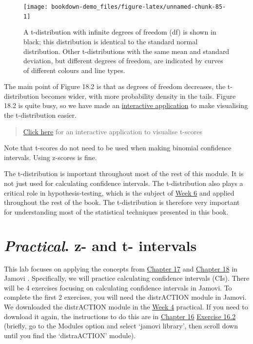 \documentclass[
]{scrbook}
\begin{document}
\begin{figure}
\texttt{[image: bookdown-demo\_files/figure-latex/unnamed-chunk-85-1]} \caption{A t-distribution with infinite degrees of freedom (df) is shown in black; this distribution is identical to the standard normal distribution. Other t-distributions with the same mean and standard deviation, but different degrees of freedom, are indicated by curves of different colours and line types.}\label{fig:unnamed-chunk-85}
\end{figure}

The main point of Figure 18.2 is that as degrees of freedom decreases, the t-distribution becomes wider, with more probability density in the tails.
Figure 18.2 is quite busy, so we have made an \href{https://bradduthie.shinyapps.io/t_score/}{interactive application} to make visualising the t-distribution easier.

\begin{quote}
\href{https://bradduthie.shinyapps.io/t_score/}{Click here} for an interactive application to visualise t-scores
\end{quote}

Note that t-scores do not need to be used when making binomial confidence intervals.
Using z-scores is fine.

The t-distribution is important throughout most of the rest of this module.
It is not just used for calculating confidence intervals.
The t-distribution also plays a critical role in hypothesis-testing, which is the subject of \protect\hyperlink{Week_6}{Week 6} and applied throughout the rest of the book.
The t-distribution is therefore very important for understanding most of the statistical techniques presented in this book.

\hypertarget{Chapter_19}{%
\chapter{\texorpdfstring{\emph{Practical}. z- and t- intervals}{Practical. z- and t- intervals}}\label{Chapter_19}}

This lab focuses on applying the concepts from \protect\hyperlink{Chapter_17}{Chapter 17} and \protect\hyperlink{Chapter_18}{Chapter 18} in Jamovi \citep{Jamovi2022}.
Specifically, we will practice calculating confidence intervals (CIs).
There will be 4 exercises focusing on calculating confidence intervals in Jamovi.
To complete the first 2 exercises, you will need the distrACTION module in Jamovi.
We downloaded the distrACTION module in the \protect\hyperlink{Week_4}{Week 4} practical.
If you need to download it again, the instructions to do this are in \protect\hyperlink{Chapter_16}{Chapter 16} \href{https://bradduthie.github.io/SCIU4T4/Chapter_16.html\#probabilities-from-a-normal-distribution}{Exercise 16.2} (briefly, go to the Modules option and select `jamovi library', then scroll down until you find the `distraACTION' module).
\end{document}
